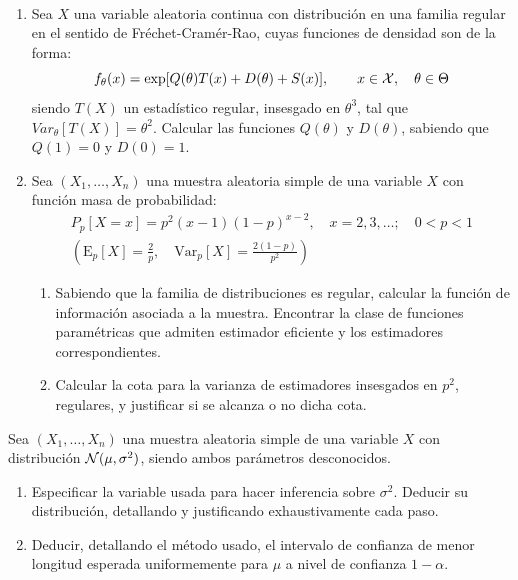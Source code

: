 \documentclass[12pt]{article}
\newcommand{\E}{\mathrm{E}}
\newcommand{\V}{\mathrm{Var}}
\begin{document}
    \begin{ejercicio}[2.25 puntos]~
        \begin{enumerate}[label=\alph*)]
            \item Sea $X$ una variable aleatoria continua con distribución en una familia regular en el sentido de Fréchet-Cramér-Rao, cuyas funciones de densidad son de la forma:
                \begin{equation*}
                    f_\theta(x) = \exp[Q(\theta)T(x) + D(\theta)+S(x)], \qquad x\in \mathcal{X}, \quad \theta\in \Theta
                \end{equation*}
                siendo $T(X)$ un estadístico regular, insesgado en $\theta^3$, tal que $Var_\theta[T(X)] = \theta^2$. Calcular las funciones $Q(\theta)$ y $D(\theta)$, sabiendo que $Q(1)=0$ y $D(0)=1$.
            \item Sea $(X_1,\ldots,X_n)$ una muestra aleatoria simple de una variable $X$ con función masa de probabilidad:
                \begin{gather*}
                    P_p[X=x] = p^2(x-1){(1-p)}^{x-2}, \quad x=2,3,\ldots; \quad 0<p<1 \\ \left(\E_p[X] = \frac{2}{p}, \quad \V_p[X]= \frac{2(1-p)}{p^2}\right)
                \end{gather*}
                \begin{enumerate}[label=\alph*)]
                    \item Sabiendo que la familia de distribuciones es regular, calcular la función de información asociada a la muestra. Encontrar la clase de funciones paramétricas que admiten estimador eficiente y los estimadores correspondientes. 
                    \item Calcular la cota para la varianza de estimadores insesgados en $p^2$, regulares, y justificar si se alcanza o no dicha cota.
                \end{enumerate}
        \end{enumerate}
    \end{ejercicio}

    \begin{ejercicio}[2 puntos]
        Sea $(X_1,\ldots,X_n)$ una muestra aleatoria simple de una variable $X$ con distribución $\mathcal{N}(\mu,\sigma^2)$, siendo ambos parámetros desconocidos.
        \begin{enumerate}[label=\alph*)]
            \item Especificar la variable usada para hacer inferencia sobre $\sigma^2$. Deducir su distribución, detallando y justificando exhaustivamente cada paso.
            \item Deducir, detallando el método usado, el intervalo de confianza de menor longitud esperada uniformemente para $\mu$ a nivel de confianza $1-\alpha$.
        \end{enumerate}
    \end{ejercicio}
\end{document}
